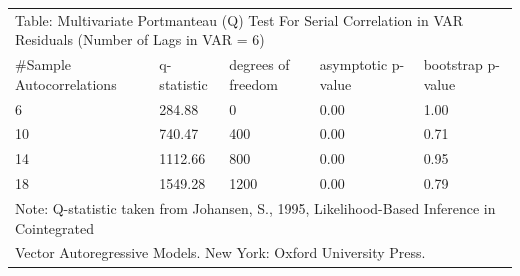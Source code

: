 \documentclass{article}
\begin{document}
 \begin{tabular}{lllll} 
 \multicolumn{5}{l}{Table: Multivariate Portmanteau (Q) Test For Serial 
     Correlation in VAR Residuals (Number of Lags in VAR =  6)} \\ 
 \#Sample Autocorrelations & q-statistic & degrees of freedom & asymptotic 
     p-value & bootstrap p-value \\ 
   6   & 284.88 &   0 & 0.00 & 1.00 \\  
  10   & 740.47 & 400 & 0.00 & 0.71 \\  
  14   & 1112.66 & 800 & 0.00 & 0.95 \\  
  18   & 1549.28 & 1200 & 0.00 & 0.79 \\ 
 \multicolumn{5}{l}{Note: Q-statistic taken from Johansen, S., 1995, 
 Likelihood-Based Inference in Cointegrated } \\  
 \multicolumn{5}{l}{Vector Autoregressive Models. New York: Oxford University 
 Press.} 
   \end{tabular} 
\end{document}
